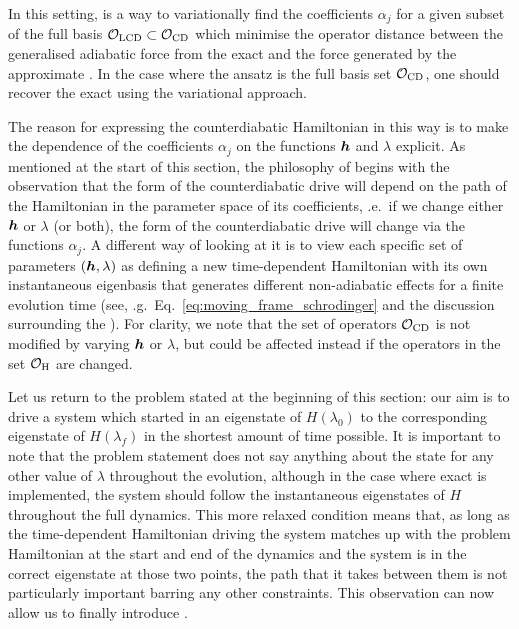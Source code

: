 In this setting,  is a way to variationally find the coefficients $\alpha_j$ for a given subset of the full  basis $\mathcal{O}_{\rm LCD} \subset \mathcal{O}_{\rm CD}$ which minimise the operator distance between the generalised adiabatic force from the exact  and the force generated by the approximate . In the case where the ansatz is the full basis set $\mathcal{O}_{\rm CD}$, one should recover the exact  using the variational approach.

The reason for expressing the counterdiabatic Hamiltonian in this way is to make the dependence of the coefficients $\alpha_j$ on the functions $\boldsymbol{h}$ and $\lambda$ explicit. As mentioned at the start of this section, the philosophy of  begins with the observation that the form of the counterdiabatic drive will depend on the path of the Hamiltonian in the parameter space of its coefficients, \@i.e.~if we change either $\boldsymbol{h}$ or $\lambda$ (or both), the form of the counterdiabatic drive will change via the functions $\alpha_j$. A different way of looking at it is to view each specific set of parameters $(\boldsymbol{h}, \lambda)$ as defining a new time-dependent Hamiltonian with its own instantaneous eigenbasis that generates different non-adiabatic effects for a finite evolution time (see, \@e.g.~Eq.~\eqref{eq:moving_frame_schrodinger} and the discussion surrounding the ). For clarity, we note that the set of operators $\mathcal{O}_{\rm CD}$ is not modified by varying $\boldsymbol{h}$ or $\lambda$, but could be affected instead if the operators in the set $\mathcal{O}_{\rm H}$  are changed.

Let us return to the problem stated at the beginning of this section: our aim is to drive a system which started in an eigenstate of $H(\lambda_0)$ to the corresponding eigenstate of $H(\lambda_f)$ in the shortest amount of time possible. It is important to note that the problem statement does not say anything about the state for any other value of $\lambda$ throughout the evolution, although in the case where exact  is implemented, the system should follow the instantaneous eigenstates of $H$ throughout the full dynamics. This more relaxed condition means that, as long as the time-dependent Hamiltonian driving the system matches up with the problem Hamiltonian at the start and end of the dynamics and the system is in the correct eigenstate at those two points, the path that it takes between them is not particularly important barring any other constraints. This observation can now allow us to finally introduce .

